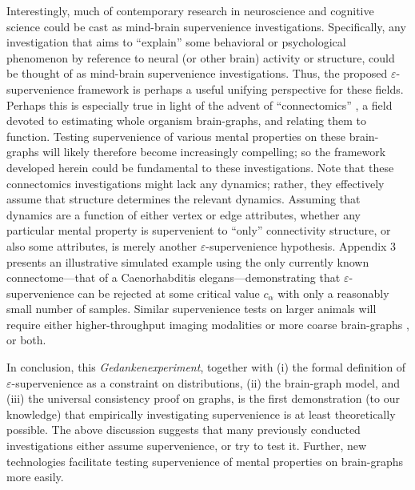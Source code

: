 \documentclass{article}
\newcommand{\eps}{\varepsilon}
\begin{document}
Interestingly, much of contemporary research in neuroscience and cognitive science could be cast as mind-brain supervenience investigations.  Specifically, any investigation that aims to ``explain'' some behavioral or psychological phenomenon by reference to neural (or other brain) activity or structure, could be thought of as mind-brain supervenience investigations.  Thus, the proposed $\eps$-supervenience framework is perhaps a useful unifying perspective for these fields.  Perhaps this is especially true in light of the advent of ``connectomics'' \cite{SpornsKotter05,Hagmann05}, a field devoted to estimating whole organism brain-graphs, and relating them to function.  Testing supervenience of various mental properties on these brain-graphs will likely therefore become increasingly compelling; so the framework developed herein could be fundamental to these investigations.  Note that these connectomics investigations might lack any dynamics; rather, they effectively assume that structure determines the relevant dynamics.  Assuming that dynamics are a function of either vertex or edge attributes, whether any particular mental property is supervenient to ``only'' connectivity structure, or also some attributes, is merely another $\eps$-supervenience hypothesis. Appendix 3 presents an illustrative simulated example using the only currently known connectome---that of a Caenorhabditis elegans---demonstrating that $\eps$-supervenience can be rejected at some critical value $c_\alpha$ with only a reasonably small number of samples. Similar supervenience tests on larger animals will require either higher-throughput imaging modalities \cite{HayworthLichtman06, Bock2011} or more coarse brain-graphs \cite{PalmAmunts10,Johansen-Berg2009}, or both.





In conclusion, this \emph{Gedankenexperiment}, together with (i) the formal definition of $\varepsilon$-supervenience as a constraint on distributions, (ii) the brain-graph model, and (iii) the universal consistency proof on graphs, is the first demonstration (to our knowledge) that empirically investigating supervenience is at least theoretically possible. The above discussion suggests that many previously conducted investigations either assume supervenience, or try to test it.  Further, new technologies facilitate testing supervenience of mental properties on brain-graphs more easily.
\end{document}
